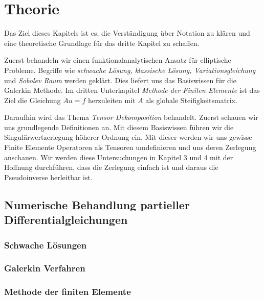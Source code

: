 \documentclass[12pt,a4paper]{scrartcl}
\numberwithin{equation}{section}
\begin{document}


\newpage

\section{Theorie}
Das Ziel dieses Kapitels ist es, die Verständigung über Notation zu klären und eine theoretische Grundlage für das dritte Kapitel zu schaffen.

Zuerst behandeln wir einen funktionalanalytischen Ansatz für elliptische Probleme. Begriffe wie \textit{schwache Lösung, klassische Lösung, Variationsgleichung} und \textit{Sobolev Raum} werden geklärt. Dies liefert uns das Basiswissen für die Galerkin Methode. 
Im dritten Unterkapitel \textit{Methode der Finiten Elemente} ist das Ziel die Gleichung $Au=f$ herzuleiten mit $A$ als globale Steifigkeitsmatrix.

Daraufhin wird das Thema \textit{Tensor Dekomposition} behandelt.
Zuerst schauen wir uns grundlegende Definitionen an. Mit diesem Basiswissen führen wir die Singulärwertzerlegung höherer Ordnung ein. Mit dieser werden wir uns gewisse Finite Elemente Operatoren als Tensoren umdefinieren und uns deren Zerlegung anschauen. Wir werden diese Untersuchungen in Kapitel 3 und 4 mit der Hoffnung durchführen, dass die Zerlegung einfach ist und daraus die Pseudoinverse herleitbar ist.


\subsection{Numerische Behandlung partieller Differentialgleichungen}
\subsubsection{Schwache Lösungen}


\subsubsection{Galerkin Verfahren}


\subsubsection{Methode der finiten Elemente}


%
\end{document}
